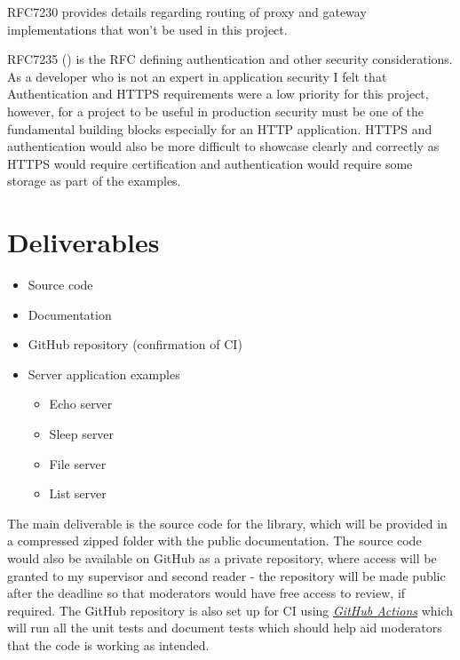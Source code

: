 \documentclass[12pt, a4paper]{article}
\begin{document}
RFC7230 provides details regarding routing of proxy and gateway implementations that
won't be used in this project.

RFC7235 (\cite{rfc7235}) is the RFC defining authentication and other security considerations. As
a developer who is not an expert in application security I felt that Authentication and HTTPS
requirements were a low priority for this project, however, for a project to be useful in production
security must be one of the fundamental building blocks especially for an HTTP application. HTTPS and
authentication would also be more difficult to showcase clearly and correctly as HTTPS would require
certification and authentication would require some storage as part of the examples.

\section{Deliverables} \label{sec:deliverables}

\begin{itemize}
    \item Source code 
    \item Documentation
    \item GitHub repository (confirmation of CI)
    \item Server application examples \footnotemark[1]
      \begin{itemize}
          \item Echo server 
          \item Sleep server 
          \item File server
          \item List server
      \end{itemize}
\end{itemize}


The main deliverable is the source code for the library, which will be provided in a compressed zipped
folder with the public documentation. The source code would also be available on GitHub as a private
repository, where access will be granted to my supervisor and second reader - the repository will
be made public after the deadline so that moderators would have free access to review, if required.
The GitHub repository is also set up for CI using
\href{https://docs.github.com/en/actions/learn-github-actions/understanding-github-actions}{\emph{GitHub Actions}}
which will run all the unit tests and document tests which should help aid moderators that the code
is working as intended.
\end{document}
